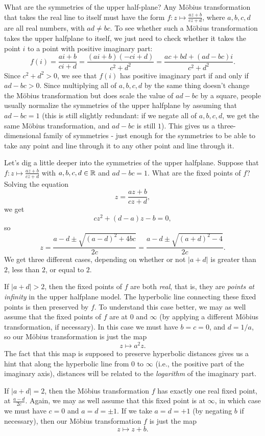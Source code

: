 What are the symmetries of the upper half-plane? Any M\"obius transformation that takes the real line to itself must have the form $f : z \mapsto \frac{az + b}{cz + d}$, where $a,b,c,d$ are all real numbers, with $ad \ne bc$. To see whether such a M\"obius transformation takes the upper halfplane to itself, we just need to check whether it takes the point $i$ to a point with positive imaginary part:
\[
f(i) = \frac{ai+b}{ci+d} = \frac{(ai+b)(-ci+d)}{c^2+d^2} = \frac{ac+bd + (ad - bc)i}{c^2 + d^2}.
\]
Since $c^2 + d^2 > 0$, we see that $f(i)$ has positive imaginary part if and only if $ad - bc > 0$. Since multiplying all of $a,b,c,d$ by the same thing doesn't change the M\"obius transformation but does scale the value of $ad - bc$ by a square, people usually normalize the symmetries of the upper halfplane by assuming that $ad - bc = 1$ (this is still slightly redundant: if we negate all of $a,b,c,d$, we get the same M\"obius transformation, and $ad - bc$ is still $1$). This gives us a three-dimensional family of symmetries - just enough for the symmetries to be able to take any point and line through it to any other point and line through it.

Let's dig a little deeper into the symmetries of the upper halfplane. Suppose that $f : z \mapsto \frac{az + b}{cz + d}$ with $a,b,c,d \in \mathbb{R}$ and $ad - bc = 1$. What are the fixed points of $f$? Solving the equation
\[
z = \frac{az+b}{cz+d},
\]
we get
\[
cz^2 + (d-a)z - b = 0,
\]
so
\[
z = \frac{a-d \pm \sqrt{(a-d)^2 + 4bc}}{2c} = \frac{a-d \pm \sqrt{(a+d)^2 - 4}}{2c}.
\]
We get three different cases, depending on whether or not $|a+d|$ is greater than $2$, less than $2$, or equal to $2$.

If $|a+d| > 2$, then the fixed points of $f$ are both \emph{real}, that is, they are \emph{points at infinity} in the upper halfplane model. The hyperbolic line connecting these fixed points is then preserved by $f$. To understand this case better, we may as well assume that the fixed points of $f$ are at $0$ and $\infty$ (by applying a different M\"obius transformation, if necessary). In this case we must have $b = c = 0$, and $d = 1/a$, so our M\"obius transformation is just the map
\[
z \mapsto a^2z.
\]
The fact that this map is supposed to preserve hyperbolic distances gives us a hint that along the hyperbolic line from $0$ to $\infty$ (i.e., the positive part of the imaginary axis), distances will be related to the \emph{logarithm} of the imaginary part.

If $|a+d| = 2$, then the M\"obius transformation $f$ has exactly one real fixed point, at $\frac{a-d}{2c}$. Again, we may as well assume that this fixed point is at $\infty$, in which case we must have $c = 0$ and $a = d = \pm 1$. If we take $a = d = +1$ (by negating $b$ if necessary), then our M\"obius transformation $f$ is just the map
\[
z \mapsto z + b.
\]

